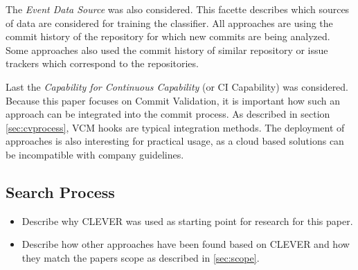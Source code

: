 The \textit{Event Data Source} was also considered. This facette describes which sources of data are considered for training the classifier. All approaches are using the commit history of the repository for which new commits are being analyzed. Some approaches also used the commit history of similar repository or issue trackers which correspond to the repositories.

Last %
the \textit{Capability for Continuous Capability} (or CI Capability) was considered. Because this paper focuses on Commit Validation, it is important how such an approach can be integrated into the commit process. As described in section \ref{sec:cvprocess}, VCM hooks are typical integration methods. The deployment of approaches is also interesting for practical usage, as a cloud based solutions can be incompatible with company guidelines.


\subsection{Search Process}
\begin{itemize}
	\item Describe why CLEVER was used as starting point for research for this paper. \cite{Nayrolles2018}
	\item Describe how other approaches have been found based on CLEVER and how they match the papers scope as described in \ref{sec:scope}.
\end{itemize}


